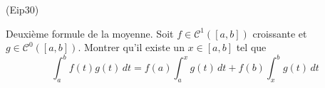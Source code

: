 \begin{tiny}(Eip30)\end{tiny} Deuxième formule de la moyenne.\newline
Soit $f\in \mathcal{C}^1([a,b])$ croissante et $g\in \mathcal{C}^0([a,b])$. Montrer qu'il existe un $x\in[a,b]$ tel que
\begin{displaymath}
 \int_a^bf(t)g(t)\,dt = f(a)\int_a^xg(t)\,dt + f(b)\int_x^bg(t)\,dt
\end{displaymath}
 